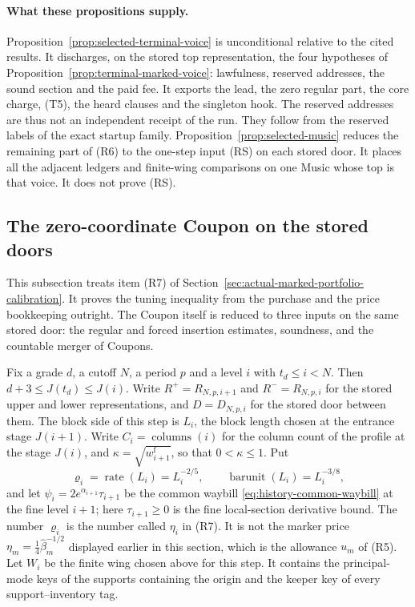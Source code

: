 \paragraph{What these propositions supply.}
Proposition~\ref{prop:selected-terminal-voice} is unconditional relative
to the cited results. It discharges, on the stored top representation,
the four hypotheses of Proposition~\ref{prop:terminal-marked-voice}:
lawfulness, reserved addresses, the sound section and the paid fee. It
exports the lead, the zero regular part, the core charge, (T5), the
heard clauses and the singleton hook. The reserved addresses are thus
not an independent receipt of the run. They follow from the reserved
labels of the exact startup family. Proposition~\ref{prop:selected-music}
reduces the remaining part of (R6) to the one-step input (RS) on each
stored door. It places all the adjacent ledgers and finite-wing
comparisons on one Music whose top is that voice. It does not prove
(RS).

\subsection{The zero-coordinate Coupon on the stored doors}
\label{sec:selected-zero-coordinate-coupon}

This subsection treats item (R7) of
Section~\ref{sec:actual-marked-portfolio-calibration}. It proves the
tuning inequality from the purchase and the price bookkeeping
outright. The Coupon itself is reduced to three inputs on the same
stored door: the regular and forced insertion estimates, soundness,
and the countable merger of Coupons.

Fix a grade $d$, a cutoff $N$, a period $p$ and a level $i$ with
$t_d\le i<N$. Then $d+3\le J(t_d)\le J(i)$. Write
$R^+=R_{N,p,i+1}$ and $R^-=R_{N,p,i}$ for the stored upper and lower
representations, and $D=D_{N,p,i}$ for the stored door between them.
The block side of this step is $L_i$, the block length chosen at the
entrance stage $J(i+1)$. Write $C_i=\operatorname{columns}(i)$ for the
column count of the profile at the stage $J(i)$, and
$\kappa=\sqrt{w^{\mathrm f}_{i+1}}$, so that $0<\kappa\le1$. Put
\[
 \varrho_i=\operatorname{rate}(L_i)=L_i^{-2/5},\qquad
 \operatorname{barunit}(L_i)=L_i^{-3/8},
\]
and let $\psi_i=2e^{\alpha_{i+1}}\tau_{i+1}$ be the common waybill
\eqref{eq:history-common-waybill} at the fine level $i+1$; here
$\tau_{i+1}\ge0$ is the fine local-section derivative bound. The number
$\varrho_i$ is the number called $\eta_i$ in (R7). It is not the marker
price $\eta_m=\tfrac14\widehat\beta_m^{-1/2}$ displayed earlier in this
section, which is the allowance $u_m$ of (R5). Let $W_i$ be the finite
wing chosen above for this step. It contains the principal-mode keys of
the supports containing the origin and the keeper key of every
support--inventory tag.

